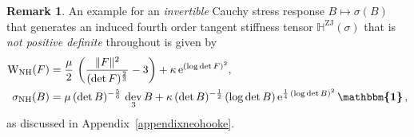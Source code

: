 \documentclass[10pt]{article}
\newcounter{theoremCounter}
\numberwithin{theoremCounter}{section}
\theoremstyle{plain}
\theoremstyle{definition}
\newtheorem{rem}[theoremCounter]{Remark}
\newcommand{\id}{{\boldsymbol{\mathbbm{1}}}}
\newcommand{\norm}[1]{\lVert #1 \rVert}
\newcommand{\WW}{\mathrm{W}}
\DeclareMathOperator{\Sym}{Sym}
\DeclareMathOperator{\dev}{dev}
\DeclareMathOperator{\ZJ}{ZJ}
\DeclareMathOperator{\NH}{NH}
\def\H{\mathbb{H}}
\numberwithin{equation}{section}
\begin{document}
\begin{rem}
An example for an \emph{invertible} Cauchy stress response $B \mapsto \sigma(B)$ that generates an induced fourth order tangent stiffness tensor $\H^{\ZJ}(\sigma)$ that is \emph{not positive definite} throughout is given by
	\begin{equation}
	\begin{alignedat}{2}
	\WW_{\NH}(F) &= \frac{\mu}{2} \, \left(\frac{\norm{F}^2}{(\det F)^{\frac23}} - 3\right) + \kappa \, \mathrm{e}^{(\log \det F)^2}, \\
	\sigma_{\NH}(B) &= \mu \, (\det B)^{-\frac56} \, \dev_3 B + \kappa \, (\det B)^{-\frac12} \, (\log \det B) \, \mathrm{e}^{\frac14 \, (\log \det B)^2} \, \id\,,
	\end{alignedat}
	\end{equation}
as discussed in Appendix~\ref{appendixneohooke}.
\end{rem}
%
\end{document}
